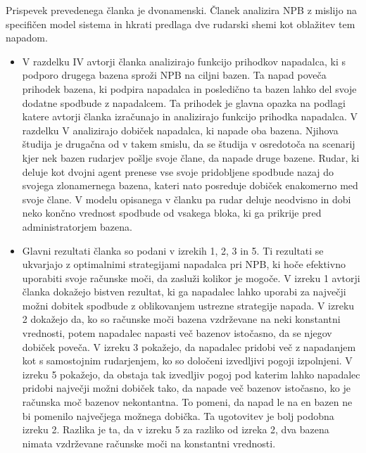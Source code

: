\documentclass{acm_proc_article-sp}
\begin{document}
Prispevek prevedenega članka \cite{originalarticle} je dvonamenski. Članek analizira NPB z mislijo na specifičen model sistema in hkrati predlaga dve rudarski shemi kot oblažitev tem napadom.
\begin{itemize}
	\item V razdelku IV avtorji članka \cite{originalarticle}  analizirajo funkcijo prihodkov napadalca, ki s podporo drugega bazena sproži NPB na ciljni bazen. Ta napad poveča prihodek bazena, ki podpira napadalca in posledično ta bazen lahko del svoje dodatne spodbude z napadalcem. Ta prihodek je glavna opazka na podlagi katere avtorji članka \cite{originalarticle}  izračunajo in analizirajo funkcijo prihodka napadalca. V razdelku V analizirajo dobiček napadalca, ki napade oba bazena.
	Njihova študija je drugačna od \cite{minnersdilemma} v takem smislu, da se študija v  \cite{minnersdilemma} osredotoča na scenarij kjer nek bazen rudarjev pošlje svoje člane, da napade druge bazene. Rudar, ki deluje kot dvojni agent prenese vse svoje pridobljene spodbude nazaj do svojega zlonamernega bazena, kateri nato posreduje dobiček enakomerno med svoje člane. V modelu opisanega v članku \cite{originalarticle} pa rudar deluje neodvisno in dobi neko končno vrednost spodbude od vsakega bloka, ki ga prikrije pred administratorjem bazena.
	\item Glavni rezultati članka so podani v izrekih 1, 2, 3 in 5. Ti rezultati se ukvarjajo z optimalnimi strategijami napadalca pri NPB, ki hoče efektivno uporabiti svoje računske moči, da zasluži kolikor je mogoče. V izreku 1 avtorji članka \cite{originalarticle} dokažejo bistven rezultat, ki ga napadalec lahko uporabi za največji možni dobitek spodbude z oblikovanjem ustrezne strategije napada. 
	V izreku 2 dokažejo da, ko so računske moči bazena vzdrževane na neki konstantni vrednosti, potem napadalec napasti več bazenov istočasno, da se njegov dobiček poveča.
	V izreku 3 pokažejo, da napadalec pridobi več z napadanjem kot s samostojnim rudarjenjem, ko so določeni izvedljivi pogoji izpolnjeni. V izreku 5 pokažejo, da obstaja tak izvedljiv pogoj pod katerim lahko napadalec pridobi največji možni dobiček tako, da napade več bazenov istočasno, ko je računska moč bazenov nekontantna. To pomeni, da napad le na en bazen ne bi pomenilo največjega možnega dobička. Ta ugotovitev je bolj podobna izreku 2. Razlika je ta, da v izreku 5 za razliko od izreka 2, dva bazena nimata vzdrževane računske moči na konstantni vrednosti.

\end{itemize}
\end{document}
